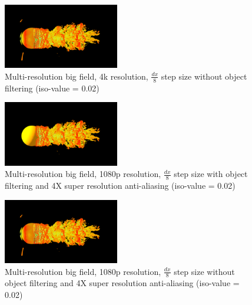 \documentclass[acmtog]{acmart}
\begin{document}
    \begin{figure}[H]
        \centering
        \includegraphics[width=0.45\textwidth]{./image/multi_big_4k_8_no_filter_0.02}
        \caption{Multi-resolution big field, 4k resolution, $ \frac{dx}{8} $ step size without object filtering (iso-value = 0.02)}\label{fig:figure2}
    \end{figure}

    \begin{figure}[H]
        \centering
        \includegraphics[width=0.45\textwidth]{./image/multi_big_1080p_8_filter_0.02_4XRES}
        \caption{Multi-resolution big field, 1080p resolution, $ \frac{dx}{8} $ step size with object filtering and 4X super resolution anti-aliasing (iso-value = 0.02)}\label{fig:figure3}
    \end{figure}

    \begin{figure}[H]
        \centering
        \includegraphics[width=0.45\textwidth]{./image/multi_big_1080p_8_no_filter_0.02_4XRES}
        \caption{Multi-resolution big field, 1080p resolution, $ \frac{dx}{8} $ step size without object filtering and 4X super resolution anti-aliasing  (iso-value = 0.02)}\label{fig:figure4}
    \end{figure}
\end{document}
